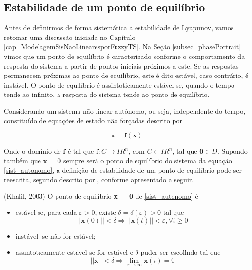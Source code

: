 \subsection{Estabilidade de um ponto de equilíbrio}

Antes de definirmos de forma sistemática a estabilidade de Lyapunov, vamos retomar uma discussão iniciada no Capítulo \ref{cap_ModelagemSisNaoLinearesporFuzzyTS}. Na Seção \ref{subsec_phasePortrait} vimos que um ponto de equilíbrio é caracterizado conforme o comportamento da resposta do sistema a partir de pontos iniciais próximos a este. Se as respostas permanecem próximas ao ponto de equilíbrio, este é dito estável, caso contrário, é instável. O ponto de equilíbrio é assintoticamente estável se, quando o tempo tende ao infinito, a resposta do sistema tende ao ponto de equilíbrio.

Considerando um sistema não linear autônomo, ou seja, independente do tempo, constituído de equações de estado não forçadas descrito por

\begin{equation}\label{sist_autonomo}
\mathbf{\dot{x} = f(x)}
\end{equation}

Onde o domínio de $\textbf{f}$ é tal que $\textbf{f}: C \rightarrow I\!R^n$, com $C \subset I\!R^n$, tal que $\textbf{0} \in D$. Supondo também que $\textbf{x = 0}$ sempre será o ponto de equilíbrio do sistema da equação \ref{sist_autonomo}, a definição de estabilidade de um ponto de equilíbrio pode ser reescrita, segundo descrito por \cite{bookkhalil:2003}, conforme apresentado a seguir.

\begin{defn} (Khalil, 2003)\cite{bookkhalil:2003}\label{def:pontoEquilibrio}
 O ponto de equilíbrio \textbf{x = 0} de \ref{sist_autonomo} é
\begin{itemize}
\item estável se, para cada $\varepsilon > 0$, existe $\delta = \delta(\varepsilon) > 0$ tal que
\begin{equation*} ||\textbf{x}(0)|| < \delta \Rightarrow ||\textbf{x}(t)|| < \varepsilon, \forall t \geq 0
\end{equation*}
\item instável, se não for estável;
\item assintoticamente estável se for estável e $\delta$ puder ser escolhido tal que
\begin{equation*}||\textbf{x}|| <\delta \Rightarrow \lim_{x\to\infty} \textbf{x}(t) = 0
\end{equation*}
\end{itemize}
 \end{defn}

